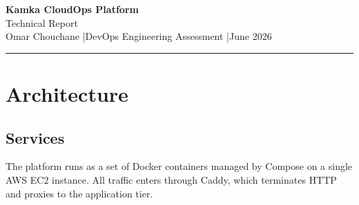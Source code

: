\documentclass[11pt,a4paper]{article}
\begin{document}
\begin{center}
  {\LARGE\bfseries\color{primary} Kamka CloudOps Platform}\\[4pt]
  {\large\color{darkgray} Technical Report}\\[8pt]
  {\small\color{darkgray} Omar Chouchane \quad|\quad DevOps Engineering Assessment \quad|\quad June 2026}
\end{center}

\vspace{4pt}
\noindent\color{midgray}\rule{\linewidth}{0.6pt}
\vspace{6pt}

\section{Architecture}

\subsection{Services}

The platform runs as a set of Docker containers managed by Compose on a single AWS EC2 instance. All traffic enters through Caddy, which terminates HTTP and proxies to the application tier.
\end{document}
